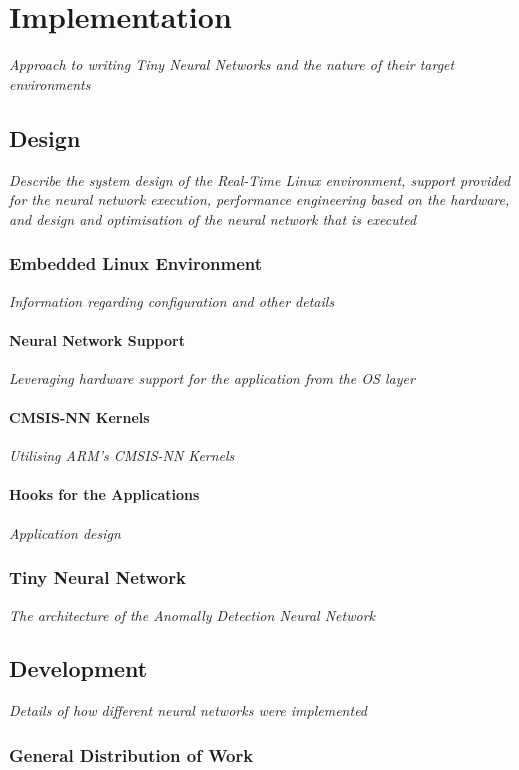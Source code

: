 \part{Implementation}

\textit{Approach to writing Tiny Neural Networks and the nature of their target environments}

\chapter{Design}
\textit{Describe the system design of the Real-Time Linux environment, support provided for the neural network execution, performance engineering based on the hardware, and design and optimisation of the neural network that is executed}

\section[Embedded Operating System]{Embedded Linux Environment}
\textit{Information regarding configuration and other details}

\subsection{Neural Network Support}
\textit{Leveraging hardware support for the application from the OS layer}

\subsection{CMSIS-NN Kernels}
\textit{Utilising ARM's CMSIS-NN Kernels}

\subsection{Hooks for the Applications}
\textit{Application design}

\section{Tiny Neural Network}
\textit{The architecture of the Anomally Detection Neural Network}

\chapter{Development}
\textit{Details of how different neural networks were implemented}

{\color{blue}
\section{General Distribution of Work}

}

